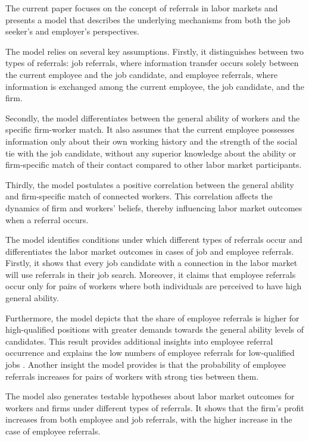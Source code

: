 \documentclass[12pt]{article}
\begin{document}
The current paper focuses on the concept of referrals in labor markets and presents a model that describes the underlying mechanisms from both the job seeker's and employer's perspectives.

The model relies on several key assumptions. Firstly, it distinguishes between two types of referrals: job referrals, where information transfer occurs solely between the current employee and the job candidate, and employee referrals, where information is exchanged among the current employee, the job candidate, and the firm.

Secondly, the model differentiates between the general ability of workers and the specific firm-worker match. It also assumes that the current employee possesses information only about their own working history and the strength of the social tie with the job candidate, without any superior knowledge about the ability or firm-specific match of their contact compared to other labor market participants.

Thirdly, the model postulates a positive correlation between the general ability and firm-specific match of connected workers. This correlation affects the dynamics of firm and workers' beliefs, thereby influencing labor market outcomes when a referral occurs.

The model identifies conditions under which different types of referrals occur and differentiates the labor market outcomes in cases of job and employee referrals. Firstly, it shows that every job candidate with a connection in the labor market will use referrals in their job search. Moreover, it claims that employee referrals occur only for pairs of workers where both individuals are perceived to have high general ability.

Furthermore, the model depicts that the share of employee referrals is higher for high-qualified positions with greater demands towards the general ability levels of candidates. This result provides additional insights into employee referral occurrence and explains the low numbers of employee referrals for low-qualified jobs \citep{friebel2023employee}. Another insight the model provides is that the probability of employee referrals increases for pairs of workers with strong ties between them.

The model also generates testable hypotheses about labor market outcomes for workers and firms under different types of referrals. It shows that the firm's profit increases from both employee and job referrals, with the higher increase in the case of employee referrals.
\end{document}
